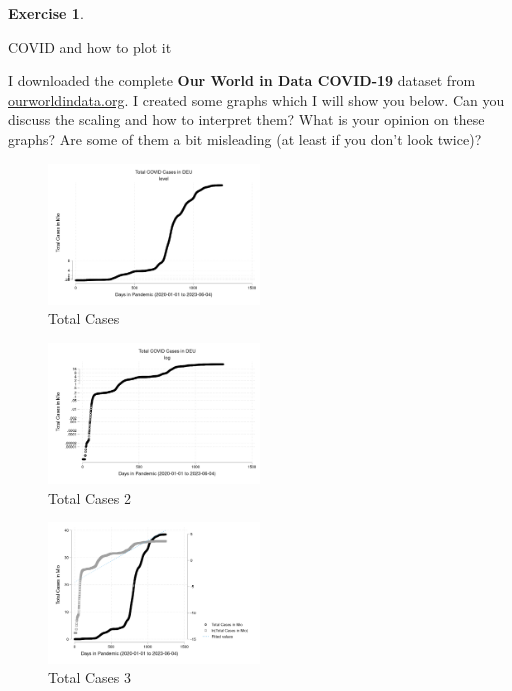 \documentclass[
  12pt,
  oneside]{book}
\theoremstyle{definition}
\theoremstyle{definition}
\theoremstyle{definition}
\newtheorem{exercise}{Exercise}[chapter]
\theoremstyle{definition}
\theoremstyle{remark}
\begin{document}
\begin{exercise}
\protect\hypertarget{exr:Covidcases}{}\label{exr:Covidcases}

COVID and how to plot it

I downloaded the complete \textbf{Our World in Data COVID-19} dataset from \href{https://ourworldindata.org/coronavirus/country/germany}{ourworldindata.org}. I created some graphs which I will show you below. Can you discuss the scaling and how to interpret them? What is your opinion on these graphs? Are some of them a bit misleading (at least if you don't look twice)?

\begin{figure}
\centering
\includegraphics[width=0.5\textwidth,height=\textheight]{fig/total.png}
\caption{Total Cases}
\end{figure}

\begin{figure}
\centering
\includegraphics[width=0.5\textwidth,height=\textheight]{fig/total2.png}
\caption{Total Cases 2}
\end{figure}

\begin{figure}
\centering
\includegraphics[width=0.5\textwidth,height=\textheight]{fig/total3.png}
\caption{Total Cases 3}
\end{figure}


\end{exercise}
\end{document}
